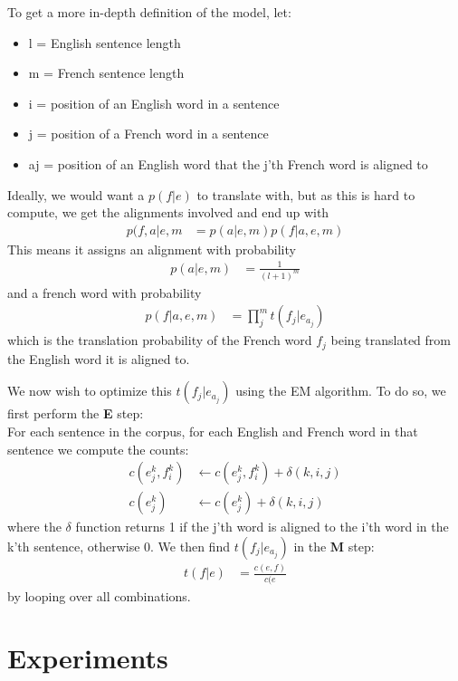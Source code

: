 \documentclass[11pt]{article}
\begin{document}
To get a more in-depth definition of the model, let:
\begin{itemize}
\item l = English sentence length
\item m = French sentence length
\item i = position of an English word in a sentence
\item j = position of a French word in a sentence
\item aj = position of an English word that the j'th French word is aligned to
\end{itemize}

Ideally, we would want a $p(f|e)$ to translate with, but as this is hard to compute, we get the alignments involved and end up with
\begin{align}
p(f,a|e,m &= p(a|e,m)p(f|a,e,m)
\end{align} 
This means it assigns an alignment with probability
\begin{align}
p(a|e,m) &= \frac{1}{(l+1)^m}
\end{align}
and a french word with probability
\begin{align}
p(f|a,e,m) &= \prod_{j}^{m}t(f_j | e_{a_j})
\end{align}
which is the translation probability of the French word $f_j$ being translated from the English word it is aligned to.

We now wish to optimize this $t(f_j | e_{a_j})$ using the EM algorithm. To do so, we first perform the \textbf{E} step:\\
For each sentence in the corpus, for each English and French word in that sentence we compute the counts:
\begin{align}
c(e_j^k , f_i^k ) &\leftarrow c(e_j^k , f_i^k ) + \delta(k,i,j)\\
c(e_j^k ) &\leftarrow c( e_j^k ) + \delta(k,i,j)
\end{align}
where the $\delta$ function returns 1 if the j'th word is aligned to the i'th word in the k'th sentence, otherwise 0. We then find $t(f_j | e_{a_j})$ in the \textbf{M} step:\\
\begin{align}
t(f|e) &= \frac{c(e,f)}{c(e}
\end{align}
by looping over all combinations.

\section{Experiments}
\end{document}
